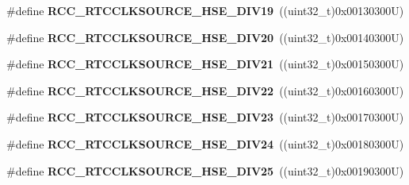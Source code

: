 \begin{DoxyCompactItemize}
\item 
\mbox{\label{group___r_c_c___r_t_c___clock___source_gaf2d8f6e3e5887bb5c853944fd35b677a}} 
\#define {\bfseries R\+C\+C\+\_\+\+R\+T\+C\+C\+L\+K\+S\+O\+U\+R\+C\+E\+\_\+\+H\+S\+E\+\_\+\+D\+I\+V19}~((uint32\+\_\+t)0x00130300\+U)
\item 
\mbox{\label{group___r_c_c___r_t_c___clock___source_gab72789d4d0c5de2a7e771d538567b92e}} 
\#define {\bfseries R\+C\+C\+\_\+\+R\+T\+C\+C\+L\+K\+S\+O\+U\+R\+C\+E\+\_\+\+H\+S\+E\+\_\+\+D\+I\+V20}~((uint32\+\_\+t)0x00140300\+U)
\item 
\mbox{\label{group___r_c_c___r_t_c___clock___source_ga70a0ee7e610273af753eca611e959dfc}} 
\#define {\bfseries R\+C\+C\+\_\+\+R\+T\+C\+C\+L\+K\+S\+O\+U\+R\+C\+E\+\_\+\+H\+S\+E\+\_\+\+D\+I\+V21}~((uint32\+\_\+t)0x00150300\+U)
\item 
\mbox{\label{group___r_c_c___r_t_c___clock___source_ga02eac6a5a2eec79514d1637c747d69aa}} 
\#define {\bfseries R\+C\+C\+\_\+\+R\+T\+C\+C\+L\+K\+S\+O\+U\+R\+C\+E\+\_\+\+H\+S\+E\+\_\+\+D\+I\+V22}~((uint32\+\_\+t)0x00160300\+U)
\item 
\mbox{\label{group___r_c_c___r_t_c___clock___source_gac707188b45213d39ad11e2440f77e235}} 
\#define {\bfseries R\+C\+C\+\_\+\+R\+T\+C\+C\+L\+K\+S\+O\+U\+R\+C\+E\+\_\+\+H\+S\+E\+\_\+\+D\+I\+V23}~((uint32\+\_\+t)0x00170300\+U)
\item 
\mbox{\label{group___r_c_c___r_t_c___clock___source_gabc9c05156ca310200f3716af4209594a}} 
\#define {\bfseries R\+C\+C\+\_\+\+R\+T\+C\+C\+L\+K\+S\+O\+U\+R\+C\+E\+\_\+\+H\+S\+E\+\_\+\+D\+I\+V24}~((uint32\+\_\+t)0x00180300\+U)
\item 
\mbox{\label{group___r_c_c___r_t_c___clock___source_gaef79b940c2bcfee57380e23c4e893767}} 
\#define {\bfseries R\+C\+C\+\_\+\+R\+T\+C\+C\+L\+K\+S\+O\+U\+R\+C\+E\+\_\+\+H\+S\+E\+\_\+\+D\+I\+V25}~((uint32\+\_\+t)0x00190300\+U)
\item 
\mbox{\label{group___r_c_c___r_t_c___clock___source_gaa3d9b9568edda64d88361e76a3a50ed0}} 

\end{DoxyCompactItemize}
